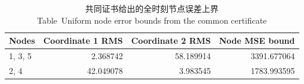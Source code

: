 \begin{table}[htbp]
\centering\small
\caption{共同证书给出的全时刻节点误差上界\\ Table~\thetable\quad Uniform node error bounds from the common certificate}\label{tab:certificate}
\begin{tabular}{lrrr}
\toprule
Nodes & Coordinate 1 RMS & Coordinate 2 RMS & Node MSE bound\\
\midrule
1, 3, 5 & 2.368742 & 58.189914 & 3391.677064 \\
2, 4 & 42.049078 & 3.983545 & 1783.993595 \\
\bottomrule
\end{tabular}
\end{table}
